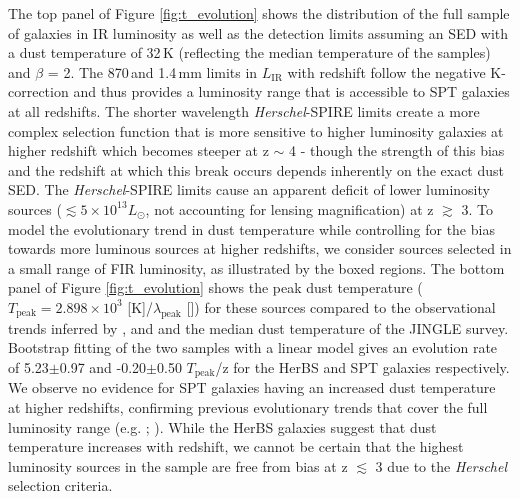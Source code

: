 The top panel of Figure \ref{fig:t_evolution} shows the distribution of the full sample of galaxies in IR luminosity as well as the detection limits assuming an SED with a dust temperature of 32\,K (reflecting the median temperature of the samples) and $\beta$ = 2. The 870\,\micron and 1.4\,mm limits in $L_{\textrm{IR}}$ with redshift follow the negative K-correction and thus provides a luminosity range that is accessible to SPT galaxies at all redshifts. The shorter wavelength \textit{Herschel}-SPIRE limits create a more complex selection function that is more sensitive to higher luminosity galaxies at higher redshift which becomes steeper at z $\sim$ 4 - though the strength of this bias and the redshift at which this break occurs depends inherently on the exact dust SED. The \textit{Herschel}-SPIRE limits cause an apparent deficit of lower luminosity sources ($\lesssim 5 \times 10^{13} L_{\odot}$, not accounting for lensing magnification) at z $\gtrsim$ 3. To model the evolutionary trend in dust temperature while controlling for the bias towards more luminous sources at higher redshifts, we consider sources selected in a small range of FIR luminosity, as illustrated by the boxed regions. The bottom panel of Figure \ref{fig:t_evolution} shows the peak dust temperature ($T_{\textrm{peak}} = 2.898 \times 10^{3}$ [\micron K]/$\lambda_{\textrm{peak}}$ [\micron]) for these sources compared to the observational trends inferred by \citealt{Schreiber_2018}, \citealt{Bouwens_2020} and \citealt{Viero_2022} and the median dust temperature of the JINGLE survey. Bootstrap fitting of the two samples with a linear model gives an evolution rate of 5.23$\pm$0.97 and -0.20$\pm$0.50 $T_{\textrm{peak}}$/z for the HerBS and SPT galaxies respectively. We observe no evidence for SPT galaxies having an increased dust temperature at higher redshifts, confirming previous evolutionary trends that cover the full luminosity range (e.g. \citealt{Reuter_2020}; \citealt{Witstok_2023}). While the HerBS galaxies suggest that dust temperature increases with redshift, we cannot be certain that the highest luminosity sources in the sample are free from bias at z $\lesssim$ 3 due to the \textit{Herschel} selection criteria. 

